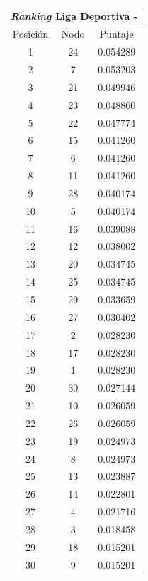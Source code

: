 \begin{center}
\begin{tabular}{|c|c|c|}
	      			\end{tabular} 
	      			    \begin{tabular}{|c|c|c|} 
			      		\hline
			  				\multicolumn{3}{c}{\emph{Ranking} Liga Deportiva - \acr{AFA}} \\
			 			\hline
	        			Posición & Nodo & Puntaje \\ \hline
						    1 & 24 & 0.054289 \\
						    2 & 7 & 0.053203 \\
						    3 & 21 & 0.049946 \\
						    4 & 23 & 0.048860 \\
						    5 & 22 & 0.047774 \\
						    6 & 15 & 0.041260 \\
						    7 & 6 & 0.041260 \\
						    8 & 11 & 0.041260 \\
						    9 & 28 & 0.040174 \\
						   10 & 5 & 0.040174 \\
						   11 & 16 & 0.039088 \\
						   12 & 12 & 0.038002 \\
						   13 & 20 & 0.034745 \\
						   14 & 25 & 0.034745 \\
						   15 & 29 & 0.033659 \\
						   16 & 27 & 0.030402 \\
						   17 & 2 & 0.028230 \\
						   18 & 17 & 0.028230 \\
						   19 & 1 & 0.028230 \\
						   20 & 30 & 0.027144 \\
						   21 & 10 & 0.026059 \\
						   22 & 26 & 0.026059 \\
						   23 & 19 & 0.024973 \\
						   24 & 8 & 0.024973 \\
						   25 & 13 & 0.023887 \\
						   26 & 14 & 0.022801 \\
						   27 & 4 & 0.021716 \\
						   28 & 3 & 0.018458 \\
						   29 & 18 & 0.015201 \\
						   30 & 9 & 0.015201 \\

	      			\end{tabular} 
	      	\end{center}

